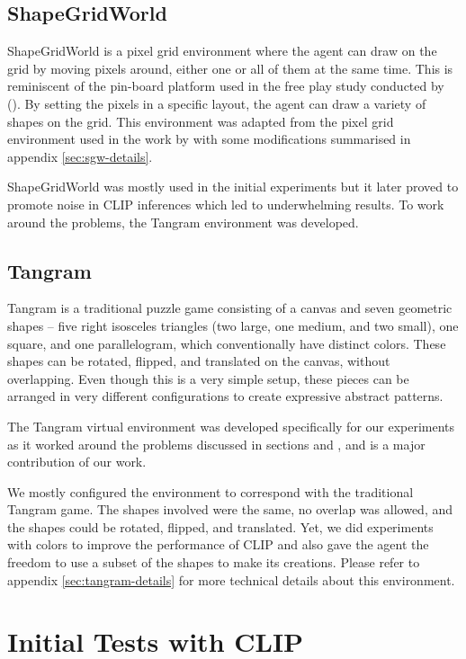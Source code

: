\subsection{ShapeGridWorld}
\label{sec:sgw}
ShapeGridWorld is a pixel grid environment where the agent can draw on the grid by moving pixels around, either one or all of them at the same time.
This is reminiscent of the pin-board platform used in the free play study conducted by \citet{diggs} ().
By setting the pixels in a specific layout, the agent can draw a variety of shapes on the grid.
This environment was adapted from the pixel grid environment used in the work by \citet{rair} with some modifications summarised in appendix \ref{sec:sgw-details}.

ShapeGridWorld was mostly used in the initial experiments but it later proved to promote noise in CLIP inferences which led to underwhelming results.
To work around the problems, the Tangram environment was developed.

\subsection{Tangram}
\label{sec:tangram}
Tangram is a traditional puzzle game consisting of a canvas and seven geometric shapes -- five right isosceles triangles (two large, one medium, and two small), one square, and one parallelogram, which conventionally have distinct colors.
These shapes can be rotated, flipped, and translated on the canvas, without overlapping.
Even though this is a very simple setup, these pieces can be arranged in very different configurations to create expressive abstract patterns.

The Tangram virtual environment was developed specifically for our experiments as it worked around the problems discussed in sections  and , and is a major contribution of our work.

We mostly configured the environment to correspond with the traditional Tangram game.
The shapes involved were the same, no overlap was allowed, and the shapes could be rotated, flipped, and translated.
Yet, we did experiments with colors to improve the performance of CLIP and also gave the agent the freedom to use a subset of the shapes to make its creations.
Please refer to appendix \ref{sec:tangram-details} for more technical details about this environment.

\section{Initial Tests with CLIP}
\label{sec:clip-custom}

